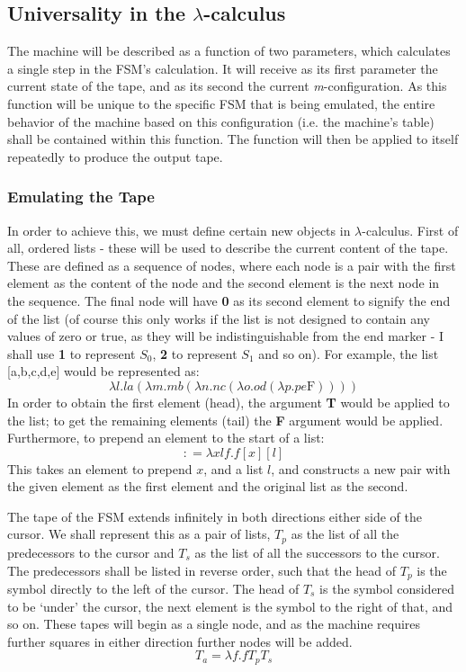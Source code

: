 \documentclass[Master.tex]{subfiles}
\begin{document}
\subsection{Universality in the $\lambda$-calculus}

The machine will be described as a function of two parameters, which calculates a single step in the FSM's calculation. It will receive as its first parameter the current state of the tape, and as its second the current \textit{m}-configuration. As this function will be unique to the specific FSM that is being emulated, the entire behavior of the machine based on this configuration (i.e. the machine's table) shall be contained within this function. The function will then be applied to itself repeatedly to produce the output tape.

\subsubsection{Emulating the Tape}
In order to achieve this, we must define certain new objects in $\lambda$-calculus. First of all, ordered lists - these will be used to describe the current content of the tape. These are defined as a sequence of nodes, where each node is a pair with the first element as the content of the node and the second element is the next node in the sequence. The final node will have \textbf{0} as its second element to signify the end of the list (of course this only works if the list is not designed to contain any values of zero or true, as they will be indistinguishable from the end marker - I shall use \textbf{1} to represent $S_0$, \textbf{2} to represent $S_1$ and so on). For example, the list [a,b,c,d,e] would be represented as:
\begin{equation*}
\lambda l.la(\lambda m.mb(\lambda n.nc(\lambda o.od(\lambda p.pe\bm{\mathrm{F}}))))
\end{equation*}
In order to obtain the first element (head), the argument \textbf{T} would be applied to the list; to get the remaining elements (tail) the \textbf{F} argument would be applied. 
Furthermore, to prepend an element to the start of a list:
\begin{equation*}
\bm{\mathrm{:}} = \lambda xlf.f[x][l]
\end{equation*}
This takes an element to prepend $x$, and a list $l$, and constructs a new pair with the given element as the first element and the original list as the second.
 
The tape of the FSM extends infinitely in both directions either side of the cursor. We shall represent this as a pair of lists, $T_p$ as the list of all the predecessors to the cursor and $T_s$ as the list of all the successors to the cursor. The predecessors shall be listed in reverse order, such that the head of $T_p$ is the symbol directly to the left of the cursor. The head of $T_s$ is the symbol considered to be `under' the cursor, the next element is the symbol to the right of that, and so on. These tapes will begin as a single node, and as the machine requires further squares in either direction further nodes will be added.
\begin{equation*}
T_a = \lambda f.f T_p T_s
\end{equation*}
\end{document}
